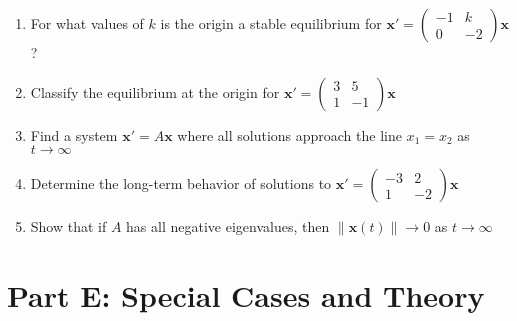 \documentclass[12pt]{article}
\begin{document}
\begin{enumerate}[start=16]
\item For what values of $k$ is the origin a stable equilibrium for $\mathbf{x}' = \begin{pmatrix} -1 & k \\ 0 & -2 \end{pmatrix}\mathbf{x}$?

\item Classify the equilibrium at the origin for $\mathbf{x}' = \begin{pmatrix} 3 & 5 \\ 1 & -1 \end{pmatrix}\mathbf{x}$

\item Find a system $\mathbf{x}' = A\mathbf{x}$ where all solutions approach the line $x_{1} = x_{2}$ as $t \to \infty$

\item Determine the long-term behavior of solutions to $\mathbf{x}' = \begin{pmatrix} -3 & 2 \\ 1 & -2 \end{pmatrix}\mathbf{x}$

\item Show that if $A$ has all negative eigenvalues, then $\|\mathbf{x}(t)\| \to 0$ as $t \to \infty$
\end{enumerate}

\section*{Part E: Special Cases and Theory}

\end{document}
